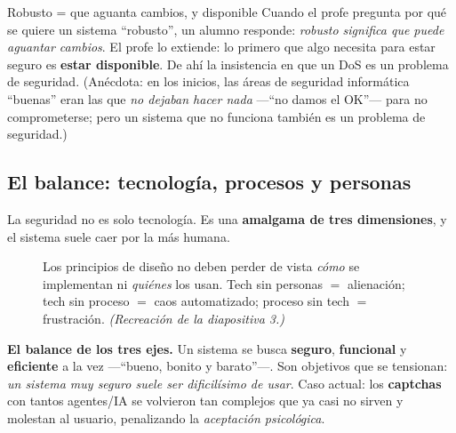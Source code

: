 \documentclass[11pt,a4paper]{article}
\begin{document}
\begin{practbox}{Robusto = que aguanta cambios, y disponible}
Cuando el profe pregunta por qué se quiere un sistema ``robusto'', un alumno responde:
\emph{robusto significa que puede aguantar cambios}. El profe lo extiende: lo primero que
algo necesita para estar seguro es \textbf{estar disponible}. De ahí la insistencia en que un
DoS es un problema de seguridad. (Anécdota: en los inicios, las áreas de seguridad
informática ``buenas'' eran las que \emph{no dejaban hacer nada} —``no damos el OK''— para no
comprometerse; pero un sistema que no funciona también es un problema de seguridad.)
\end{practbox}

\subsection{El balance: tecnología, procesos y personas}
La seguridad no es solo tecnología. Es una \textbf{amalgama de tres dimensiones}, y el sistema
suele caer por la más humana.

\begin{figure}[h]
\centering
{}
\caption{Los principios de diseño no deben perder de vista \emph{cómo} se implementan ni
\emph{quiénes} los usan. Tech sin personas $=$ alienación; tech sin proceso $=$ caos
automatizado; proceso sin tech $=$ frustración. \textit{(Recreación de la diapositiva 3.)}}
\end{figure}

\begin{slidebox}
\textbf{El balance de los tres ejes.} Un sistema se busca \textbf{seguro}, \textbf{funcional}
y \textbf{eficiente} a la vez —``bueno, bonito y barato''—. Son objetivos que se tensionan:
\emph{un sistema muy seguro suele ser dificilísimo de usar}. Caso actual: los \textbf{captchas}
con tantos agentes/IA se volvieron tan complejos que ya casi no sirven y molestan al usuario,
penalizando la \emph{aceptación psicológica}.
\end{slidebox}
\end{document}

